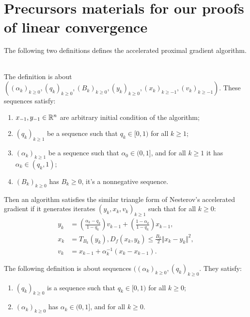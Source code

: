 \documentclass[12pt]{article}
\begin{document}
\section{Precursors materials for our proofs of linear convergence}
    The following two definitions defines the accelerated proximal gradient algorithm. 
    \begin{definition}\;\label{def:st-apg}\\
        The definition is about $((\alpha_k)_{k \ge 0}, (q_k)_{k \ge 0}, (B_k)_{k \ge 0}, (y_k)_{k \ge 0}, (x_k)_{k \ge -1}, (v_k)_{k \ge -1})$. 
        These sequences satisfy:
        \begin{enumerate}[nosep]
            \item $x_{-1}, y_{- 1}\in \mathbb R^n$ are arbitrary initial condition of the algorithm;
            \item $(q_k)_{k \ge 1}$ be a sequence such that $q_k \in [0, 1)$ for all $k \ge 1$;
            \item $(\alpha_k)_{k \ge 1}$ be a sequence such that $\alpha_0 \in (0, 1]$, and for all $k \ge 1$ it has $\alpha_k \in (q_k, 1)$;
            \item $(B_k)_{k \ge 0}$ has $B_k \ge 0$, it's a nonnegative sequence. 
        \end{enumerate}
        Then an algorithm satisfies the similar triangle form of Nesterov's accelerated gradient if it generates iterates $(y_k, x_k, v_k)_{k \ge 1}$ such that for all $k\ge 0$: 
        \begin{align*}
            y_k &= \left(\frac{\alpha_k - q_k}{1 - q_k}\right)v_{k - 1} 
            + \left(\frac{1 - \alpha_k}{1 - q_k}\right) x_{k - 1},
            \\
            x_k &= T_{B_k}(y_k), D_f(x_k, y_k) \le \frac{B_k}{2}\Vert x_k - y_k\Vert^2, 
            \\
            v_k &= x_{k - 1} + \alpha_k^{-1}(x_k - x_{k - 1}). 
        \end{align*}
    \end{definition}
    \begin{definition}\label{def:rlx-momentum-seq}
        The following definition is about sequences $((\alpha_k)_{k \ge 0}, (q_k)_{k \ge 0}$. 
        They satisfy:
        \begin{enumerate}[nosep]
            \item $(q_k)_{k \ge 0}$ is a sequence such that $q_k \in [0, 1)$ for all $k \ge 0$;
            \item $(\alpha_k)_{k \ge 0}$ has $\alpha_k \in (0, 1]$, and for all $k \ge 0$. 
        \end{enumerate}
    \end{definition}
\end{document}
